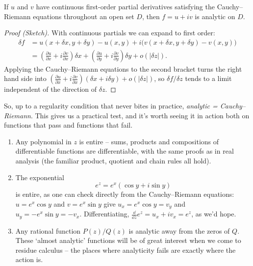 \begin{theorem}
	If $u$ and $v$ have continuous first-order partial derivatives satisfying the Cauchy--Riemann equations throughout an open set $D$, then $f = u + iv$ is analytic on $D$.
\end{theorem}
\begin{proof}[Proof (Sketch)]
	With continuous partials we can expand to first order:
	\begin{align*}
		\delta f &= u(x + \delta x, y + \delta y) - u(x, y) + i \big( v(x + \delta x, y + \delta y) - v(x, y)\big) \\
		&= \left(\frac{\partial u}{\partial x} + i \frac{\partial v}{\partial x}\right)\delta x + \left(\frac{\partial u}{\partial y} + i \frac{\partial v}{\partial y}\right)\delta y + o(|\delta z|).
	\end{align*}
	Applying the Cauchy--Riemann equations to the second bracket turns the right hand side into $\left(\frac{\partial u}{\partial x} + i \frac{\partial v}{\partial x}\right)(\delta x + i \delta y) + o(|\delta z|)$, so $\delta f/\delta z$ tends to a limit independent of the direction of $\delta z$.
\end{proof}

So, up to a regularity condition that never bites in practice, \emph{analytic = Cauchy--Riemann}. This gives us a practical test, and it's worth seeing it in action both on functions that pass and functions that fail.

\begin{example}
	\begin{enumerate}[label=(\roman*)]
		\item Any polynomial in $z$ is entire -- sums, products and compositions of differentiable functions are differentiable, with the same proofs as in real analysis (the familiar product, quotient and chain rules all hold).
		\item The exponential
		$$
		e^z = e^x(\cos y + i \sin y)
		$$
		is entire, as one can check directly from the Cauchy--Riemann equations: $u = e^x \cos y$ and $v = e^x \sin y$ give $u_x = e^x \cos y = v_y$ and $u_y = -e^x \sin y = -v_x$. Differentiating, $\frac{\dd}{\dd z} e^z = u_x + i v_x = e^z$, as we'd hope.
		\item Any rational function $P(z)/Q(z)$ is analytic away from the zeros of $Q$. These `almost analytic' functions will be of great interest when we come to residue calculus -- the places where analyticity fails are exactly where the action is.
	\end{enumerate}
\end{example}

